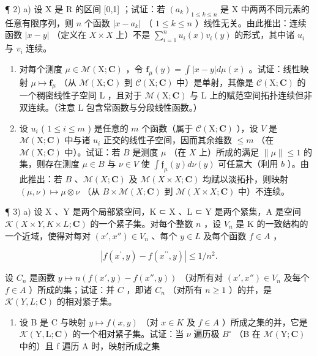 ¶ 2) a) 设 X 是 R 的区间 {[}0,1{]} ；试证：若 \((a_k)_{1 \leqslant k \leqslant n}\) 是 X 中两两不同元素的任意有限序列，则 \(n\) 个函数 \(|x - a_k|\) （ \(1 \leqslant k \leqslant n\) ）线性无关。由此推出：连续函数 \(|x - y|\) （定义在 \(X \times X\) 上）不是 \(\sum_{i=1}^{n} u_i(x)v_i(y)\) 的形式，其中诸 \(u_i\) 与 \(v_i\) 连续。

\begin{enumerate}
\def\labelenumi{\alph{enumi})}
\setcounter{enumi}{1}
\item
  对每个测度 \(\mu \in \mathcal{M}(\mathrm{X};\mathbf{C})\) ，令 \(\mathbf{f}_{\mu}(y) = \int |x - y| d\mu(x)\) 。试证：线性映射 \(\mu \mapsto \mathbf{f}_{\mu}\) （从 \(\mathcal{M}(\mathrm{X};\mathbf{C})\) 到 \(\mathcal{C}(\mathrm{X};\mathbf{C})\) 中）是单射，其像是 \(\mathcal{C}(\mathrm{X};\mathbf{C})\) 的一个稠密线性子空间 L ，且对于 \(\mathcal{M}(\mathrm{X};\mathbf{C})\) 与 L 上的赋范空间拓扑连续但非双连续。（注意 L 包含常函数与分段线性函数。）
\item
  设 \(u_{i}\) ( \(1 \leqslant i \leqslant m\) ) 是任意的 \(m\) 个函数（属于 \(\mathcal{C}(\mathrm{X};\mathbf{C})\) ），设 \(V\) 是 \(\mathcal{M}(\mathrm{X};\mathbf{C})\) 中与诸 \(u_{i}\) 正交的线性子空间，因而其余维数 \(\leqslant m\) （在 \(\mathcal{M}(\mathrm{X};\mathbf{C})\) 中）。试证：若 \(B\) 是测度 \(\mu\) （在 \(X\) 上）所成的满足 \(\| \mu \| \leqslant 1\) 的集，则存在测度 \(\mu \in B\) 与 \(\nu \in V\) 使 \(\int \mathfrak{f}_{\mu}(y)d\nu(y)\) 可任意大（利用 \(b\) ）。由此推出：若 \(B\) 、\(\mathcal{M}(X; \mathbf{C})\) 及 \(\mathcal{M}(X \times X; \mathbf{C})\) 均赋以淡拓扑，则映射 \((\mu, \nu) \mapsto \mu \otimes \nu\) （从 \(B \times \mathcal{M}(X; \mathbf{C})\) 到 \(\mathcal{M}(X \times X; \mathbf{C})\) 中）不连续。
\end{enumerate}

¶ 3) a) 设 X 、Y 是两个局部紧空间，K ⊂ X 、L ⊂ Y 是两个紧集，A 是空间 \(\mathcal{K}(X \times Y, K \times L; \mathbf{C})\) 的一个紧子集。对每个整数 \(n\) ，设 \(V_n\) 是 K 的一致结构的一个近域，使得对每对 \((x', x'') \in V_n\) 、每个 \(y \in L\) 及每个函数 \(f \in A\) ，

\[
\left| f (x ^ {\prime}, y) - f (x ^ {\prime \prime}, y) \right| \leqslant 1 / n ^ {2}.
\]

设 \(C_n\) 是函数 \(y \mapsto n(f(x', y) - f(x'', y))\) （对所有对 \((x', x'') \in V_n\) 及每个 \(f \in A\) ）所成的集；试证：并 \(C\) ，即诸 \(C_n\) （对所有 \(n \geqslant 1\) ）的并，是 \(\mathcal{K}(Y, L; \mathbf{C})\) 的相对紧子集。

\begin{enumerate}
\def\labelenumi{\alph{enumi})}
\setcounter{enumi}{1}
\tightlist
\item
  设 B 是 C 与映射 \(y \mapsto f(x, y)\) （对 \(x \in K\) 及 \(f \in A\) ）所成之集的并，它是 \(\mathcal{K}(\mathrm{Y}, \mathrm{L}; \mathbf{C})\) 的一个相对紧子集。试证：当 \(\nu\) 遍历极 \(B^{\circ}\) （B 在 \(\mathcal{M}(\mathrm{Y}; \mathbf{C})\) 中的）且 f 遍历 A 时，映射所成之集
\end{enumerate}

